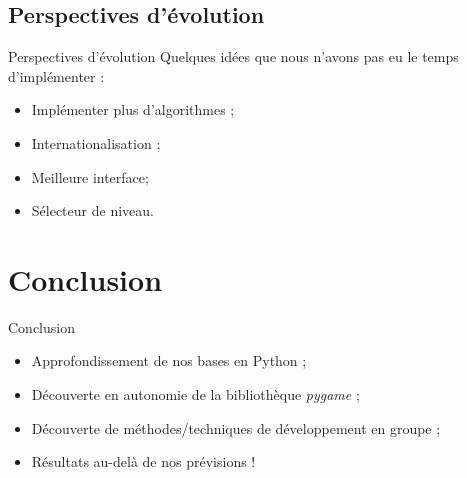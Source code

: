 \documentclass{beamer}
\begin{document}
\subsection{Perspectives d'évolution}
	\begin{frame}{Perspectives d'évolution}
		Quelques idées que nous n'avons pas eu le temps d'implémenter :
		\begin{itemize}
		\setlength{\itemsep}{0.3cm}
			\item Implémenter plus d'algorithmes ;
			\item Internationalisation ;
			\item Meilleure interface;
            \item Sélecteur de niveau.
		\end{itemize}
	\end{frame}

\section{Conclusion}
	\begin{frame}{Conclusion}
		\begin{itemize}
		\setlength{\itemsep}{0.4cm}
			\item Approfondissement de nos bases en Python ;
			\item Découverte en autonomie de la bibliothèque \emph{pygame} ;
			\item Découverte de méthodes/techniques de développement en groupe ;
			\item Résultats au-delà de nos prévisions !
		\end{itemize}
	\end{frame}
\end{document}
